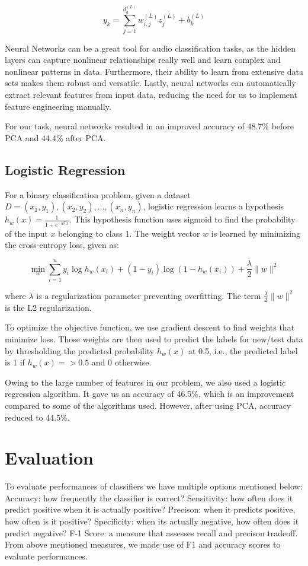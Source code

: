 \documentclass[conference]{IEEEtran}
\begin{document}
$$
y_k = \sum_{j=1}^{d_{{h}}^{(L)}} w_{i,j}^{(L)} z_j^{(L)} + b_k^{(L)}
$$

Neural Networks can be a great tool for audio classification tasks, as the hidden layers can capture nonlinear relationships really well and learn complex and nonlinear patterns in data. Furthermore, their ability to learn from extensive data sets makes them robust and versatile. Lastly, neural networks can automatically extract relevant features from input data, reducing the need for us to implement feature engineering manually. 

For our task, neural networks resulted in an improved accuracy of 48.7\% before PCA and 44.4\% after PCA.


\subsection{Logistic Regression}
For a binary classification problem, given a dataset $D = {(x_1, y_1), (x_2, y_2), \ldots, (x_n, y_n)}$, logistic regression learns a hypothesis $h_w(x) = \frac{1}{1 + e^{-w^Tx}}$. This hypothesis function uses sigmoid to find the probability of the input $x$ belonging to class 1.
The weight vector $w$ is learned by minimizing the cross-entropy loss, given as:

$$
\min_w \sum_{i=1}^n { y_i \log h_{w}(x_i) + (1-y_i) \log (1-h_{w}(x_i))}  + \frac{\lambda}{2} \|w\|^2
$$

where $\lambda$ is a regularization parameter preventing overfitting. The term $\frac{\lambda}{2} \|w\|^2$ is the L2 regularization.

To optimize the objective function, we use gradient descent to find weights that minimize loss. Those weights are then used to predict the labels for new/test data by thresholding the predicted probability $h_{w}({x})$ at 0.5, i.e., the predicted label is 1 if $h_{w}({x}) => 0.5$ and 0 otherwise.

Owing to the large number of features in our problem, we also used a logistic regression algorithm. It gave us an accuracy of 46.5\%, which is an improvement compared to some of the algorithms used. However, after using PCA, accuracy reduced to 44.5\%.

\section{Evaluation}
To evaluate performances of classifiers we have multiple options mentioned below:
Accuracy: how frequently the classifier is correct?
Sensitivity: how often does it predict positive when it is actually positive?
Precison: when it predicts positive, how often is it positive? 
Specificity: when its actually negative, how often does it predict negative?
F-1 Score: a measure that assesses recall and precison tradeoff.
From above mentioned measures, we made use of F1 and accuracy scores to evaluate performances.\\
\end{document}
